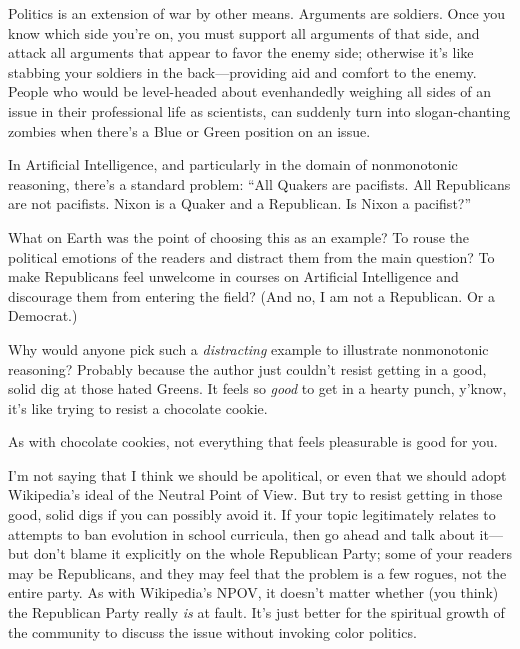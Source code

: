 {
 Politics is an extension of war by other means. Arguments are
soldiers. Once you know which side you're on, you must
support all arguments of that side, and attack all arguments that
appear to favor the enemy side; otherwise it's like
stabbing your soldiers in the back---providing aid and comfort to the
enemy. People who would be level-headed about evenhandedly weighing all
sides of an issue in their professional life as scientists, can
suddenly turn into slogan-chanting zombies when there's
a Blue or Green position on an issue.}

{
 In Artificial Intelligence, and particularly in the domain of
nonmonotonic reasoning, there's a standard problem:
``All Quakers are pacifists. All Republicans are not
pacifists. Nixon is a Quaker and a Republican. Is Nixon a
pacifist?''}

{
 What on Earth was the point of choosing this as an example? To
rouse the political emotions of the readers and distract them from the
main question? To make Republicans feel unwelcome in courses on
Artificial Intelligence and discourage them from entering the field?
(And no, I am not a Republican. Or a Democrat.)}

{
 Why would anyone pick such a \textit{distracting} example to
illustrate nonmonotonic reasoning? Probably because the author just
couldn't resist getting in a good, solid dig at those
hated Greens. It feels so \textit{good} to get in a hearty punch,
y'know, it's like trying to resist a
chocolate cookie.}

{
 As with chocolate cookies, not everything that feels pleasurable
is good for you.}

{
 I'm not saying that I think we should be
apolitical, or even that we should adopt Wikipedia's
ideal of the Neutral Point of View. But try to resist getting in those
good, solid digs if you can possibly avoid it. If your topic
legitimately relates to attempts to ban evolution in school curricula,
then go ahead and talk about it---but don't blame it
explicitly on the whole Republican Party; some of your readers may be
Republicans, and they may feel that the problem is a few rogues, not
the entire party. As with Wikipedia's NPOV, it
doesn't matter whether (you think) the Republican Party
really \textit{is} at fault. It's just better for the
spiritual growth of the community to discuss the issue without invoking
color politics.}

\myendsectiontext


